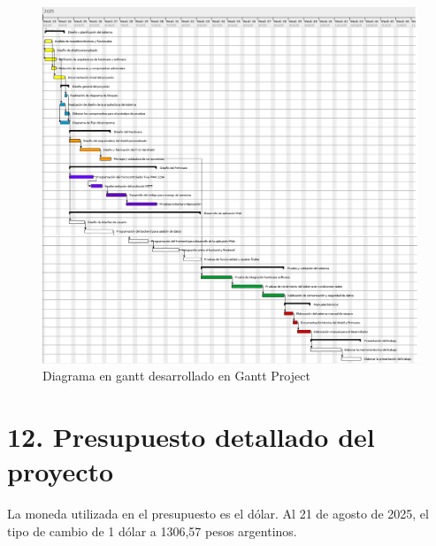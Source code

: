 \documentclass[
11pt, %
]{charter}
\begin{document}
\begin{landscape}
\begin{figure}[htpb]
\centering 
\includegraphics[height=1\textheight]{./Figuras/gantt2.png}
\caption{Diagrama en gantt desarrollado en Gantt Project} 
\label{fig:Gantt2}
\end{figure}

\end{landscape}


\section{12. Presupuesto detallado del proyecto}
\label{sec:presupuesto}

La moneda utilizada en el presupuesto es el dólar. Al 21 de agosto de 2025, el tipo de cambio de 1 dólar a 1306,57 pesos argentinos.
\end{document}

